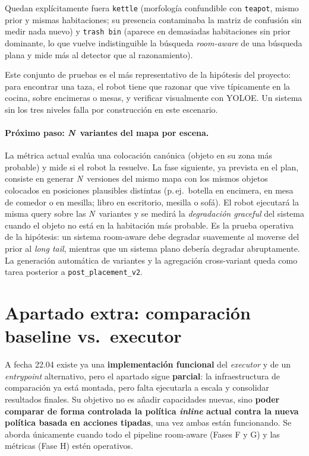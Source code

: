\documentclass[11pt,a4paper]{article}
\begin{document}
Quedan explícitamente fuera \texttt{kettle} (morfología confundible con
\texttt{teapot}, mismo prior y mismas habitaciones; su presencia
contaminaba la matriz de confusión sin medir nada nuevo) y
\texttt{trash bin} (aparece en demasiadas habitaciones sin prior
dominante, lo que vuelve indistinguible la búsqueda \emph{room-aware} de
una búsqueda plana y mide más al detector que al razonamiento).

Este conjunto de pruebas es el más representativo de la hipótesis del
proyecto: para encontrar una taza, el robot tiene que razonar que vive
típicamente en la cocina, sobre encimeras o mesas, y verificar visualmente
con YOLOE. Un sistema sin los tres niveles falla por construcción en este
escenario.

\paragraph{Próximo paso: \emph{N}~variantes del mapa por escena.}
La métrica actual evalúa una colocación canónica (objeto en su zona más
probable) y mide si el robot la resuelve. La fase siguiente, ya prevista
en el plan, consiste en generar \emph{N}~versiones del mismo mapa con
los mismos objetos colocados en posiciones plausibles distintas (p.\,ej.\
botella en encimera, en mesa de comedor o en mesilla; libro en
escritorio, mesilla o sofá). El robot ejecutará la misma query sobre las
\emph{N}~variantes y se medirá la \emph{degradación graceful} del
sistema cuando el objeto no está en la habitación más probable. Es la
prueba operativa de la hipótesis: un sistema room-aware debe degradar
suavemente al moverse del prior al \emph{long tail}, mientras que un
sistema plano debería degradar abruptamente. La generación automática
de variantes y la agregación cross-variant queda como tarea posterior a
\texttt{post\_placement\_v2}.

\section{Apartado extra: comparación baseline vs.\ executor}
\label{sec:apartado-extra}

A fecha 22.04 existe ya una \textbf{implementación funcional} del
\emph{executor} y de un \emph{entrypoint} alternativo, pero el apartado sigue
\textbf{parcial}: la infraestructura de comparación ya está montada, pero falta
ejecutarla a escala y consolidar resultados finales. Su objetivo no es
añadir capacidades nuevas, sino \textbf{poder comparar de forma controlada
la política \emph{inline} actual contra la nueva política basada en
acciones tipadas}, una vez ambas están funcionando. Se aborda únicamente
cuando todo el pipeline room-aware (Fases F y G) y las métricas (Fase H)
estén operativos.
\end{document}
